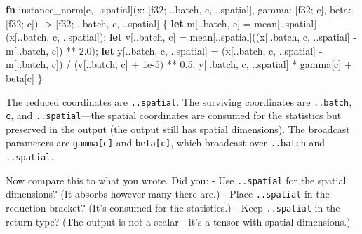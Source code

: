 \documentclass[11pt,titlepage]{article}
\newenvironment{Shaded}{}{}
\newcommand{\DataTypeTok}[1]{\textcolor[rgb]{0.56,0.13,0.00}{#1}}
\newcommand{\DecValTok}[1]{\textcolor[rgb]{0.25,0.63,0.44}{#1}}
\newcommand{\KeywordTok}[1]{\textcolor[rgb]{0.00,0.44,0.13}{\textbf{#1}}}
\newcommand{\NormalTok}[1]{#1}
\newcommand{\OperatorTok}[1]{\textcolor[rgb]{0.40,0.40,0.40}{#1}}
\begin{document}
\begin{Shaded}
\begin{Highlighting}[]
\KeywordTok{fn}\NormalTok{ instance_norm[c, ..spatial](x: }\OperatorTok{[}\DataTypeTok{f32}\NormalTok{; ..batch, c, ..spatial}\OperatorTok{]}\NormalTok{,}
\NormalTok{                                gamma: }\OperatorTok{[}\DataTypeTok{f32}\NormalTok{; c}\OperatorTok{]}\NormalTok{,}
\NormalTok{                                beta: }\OperatorTok{[}\DataTypeTok{f32}\NormalTok{; c}\OperatorTok{]}\NormalTok{)}
\NormalTok{    -> }\OperatorTok{[}\DataTypeTok{f32}\NormalTok{; ..batch, c, ..spatial}\OperatorTok{]}
\OperatorTok{\{}
    \KeywordTok{let}\NormalTok{ m}\OperatorTok{[}\NormalTok{..batch, c}\OperatorTok{]}\NormalTok{ = mean}\OperatorTok{[}\NormalTok{..spatial}\OperatorTok{]}\NormalTok{(x}\OperatorTok{[}\NormalTok{..batch, c, ..spatial}\OperatorTok{]}\NormalTok{);}
    \KeywordTok{let}\NormalTok{ v}\OperatorTok{[}\NormalTok{..batch, c}\OperatorTok{]}\NormalTok{ = mean}\OperatorTok{[}\NormalTok{..spatial}\OperatorTok{]}\NormalTok{((x}\OperatorTok{[}\NormalTok{..batch, c, ..spatial}\OperatorTok{]}\NormalTok{ - m}\OperatorTok{[}\NormalTok{..batch, c}\OperatorTok{]}\NormalTok{) ** }\DecValTok{2.0}\NormalTok{);}
    \KeywordTok{let}\NormalTok{ y}\OperatorTok{[}\NormalTok{..batch, c, ..spatial}\OperatorTok{]}\NormalTok{ =}
\NormalTok{        (x}\OperatorTok{[}\NormalTok{..batch, c, ..spatial}\OperatorTok{]}\NormalTok{ - m}\OperatorTok{[}\NormalTok{..batch, c}\OperatorTok{]}\NormalTok{) / (v}\OperatorTok{[}\NormalTok{..batch, c}\OperatorTok{]}\NormalTok{ + }\DecValTok{1}\NormalTok{e-}\DecValTok{5}\NormalTok{) ** }\DecValTok{0.5}\NormalTok{;}
\NormalTok{    y}\OperatorTok{[}\NormalTok{..batch, c, ..spatial}\OperatorTok{]}\NormalTok{ * gamma}\OperatorTok{[}\NormalTok{c}\OperatorTok{]}\NormalTok{ + beta}\OperatorTok{[}\NormalTok{c}\OperatorTok{]}
\OperatorTok{\}}
\end{Highlighting}
\end{Shaded}

The reduced coordinates are \texttt{..spatial}. The surviving
coordinates are \texttt{..batch}, \texttt{c}, and
\texttt{..spatial}---the spatial coordinates are consumed for the
statistics but preserved in the output (the output still has spatial
dimensions). The broadcast parameters are \texttt{gamma{[}c{]}} and
\texttt{beta{[}c{]}}, which broadcast over \texttt{..batch} and
\texttt{..spatial}.

Now compare this to what you wrote. Did you: - Use \texttt{..spatial}
for the spatial dimensions? (It absorbs however many there are.) - Place
\texttt{..spatial} in the reduction bracket? (It's consumed for the
statistics.) - Keep \texttt{..spatial} in the return type? (The output
is not a scalar---it's a tensor with spatial dimensions.)
\end{document}
